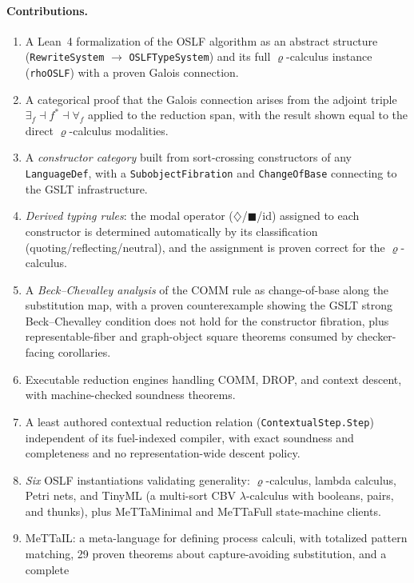 \documentclass[]{article}
\newcommand{\code}[1]{\texttt{#1}}
\newcommand{\rhocalc}{\ensuremath{\varrho}}
\newcommand{\Dia}{\ensuremath{\diamondsuit}}
\newcommand{\Bx}{\ensuremath{\blacksquare}}
\newcommand{\OSLF}{\textup{OSLF}}
\newcommand{\MeTTaIL}{\textup{MeTTaIL}}
\begin{document}
\paragraph{Contributions.}
\begin{enumerate}
\item A Lean~4 formalization of the \OSLF{} algorithm as an abstract structure
  (\code{RewriteSystem} $\to$ \code{OSLFTypeSystem}) and its full \rhocalc{}-calculus
  instance (\code{rhoOSLF}) with a proven Galois connection.
\item A categorical proof that the Galois connection arises from the adjoint triple
  $\exists_f \dashv f^* \dashv \forall_f$ applied to the reduction span, with the
  result shown equal to the direct \rhocalc{}-calculus modalities.
\item A \emph{constructor category} built from sort-crossing constructors of any
  \code{LanguageDef}, with a \code{SubobjectFibration} and \code{ChangeOfBase}
  connecting to the GSLT infrastructure.
\item \emph{Derived typing rules}: the modal operator ($\Dia$/$\Bx$/id) assigned to
  each constructor is determined automatically by its classification
  (quoting/reflecting/neutral), and the assignment is proven correct for the
  \rhocalc{}-calculus.
\item A \emph{Beck--Chevalley analysis} of the COMM rule as change-of-base along the
  substitution map, with a proven counterexample showing the GSLT strong
  Beck--Chevalley condition does not hold for the constructor fibration, plus
  representable-fiber and graph-object square theorems consumed by checker-facing
  corollaries.
\item Executable reduction engines handling COMM, DROP, and context descent, with
  machine-checked soundness theorems.
\item A least authored contextual reduction relation
  (\code{ContextualStep.Step}) independent of its fuel-indexed compiler, with
  exact soundness and completeness and no representation-wide descent policy.
\item \emph{Six} \OSLF{} instantiations validating generality:
  \rhocalc{}-calculus, lambda calculus, Petri nets, and TinyML (a multi-sort CBV
  $\lambda$-calculus with booleans, pairs, and thunks), plus MeTTaMinimal and
  MeTTaFull state-machine clients.
\item \MeTTaIL{}: a meta-language for defining process calculi, with totalized pattern
  matching, 29 proven theorems about capture-avoiding substitution, and a complete

\end{enumerate}
\end{document}
